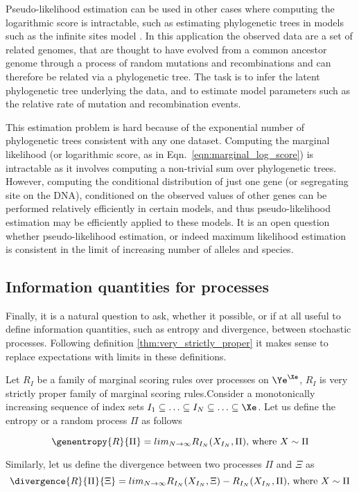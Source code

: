 Pseudo-likelihood estimation can be used in other cases where computing the logarithmic score is intractable, such as estimating phylogenetic trees in models such as the infinite sites model \cite{something, something} . In this application the observed data are a set of related genomes, that are thought to have evolved from a common ancestor genome through a process of random mutations and recombinations and can therefore be related via a phylogenetic tree. The task is to infer the latent phylogenetic tree underlying the data, and to estimate model parameters such as the relative rate of mutation and recombination events.

This estimation problem is hard because of the exponential number of phylogenetic trees consistent with any one dataset. Computing the marginal likelihood (or logarithmic score, as in Eqn.\ \eqref{eqn:marginal_log_score}) is intractable as it involves computing a non-trivial sum over phylogenetic trees. However, computing the conditional distribution of just one gene (or segregating site on the DNA), conditioned on the observed values of other genes can be performed relatively efficiently in certain models, and thus pseudo-likelihood estimation may be efficiently applied to these models. It is an open question whether pseudo-likelihood estimation, or indeed maximum likelihood estimation is consistent in the limit of increasing number of alleles and species.

\subsection{Information quantities for processes}

Finally, it is a natural question to ask, whether it possible, or if at all useful to define information quantities, such as entropy and divergence, between stochastic processes. Following definition \ref{thm:very_strictly_proper} it makes sense to replace expectations with limits in these definitions.

\begin{definition}\label{thm:process_entropy_divergence}
Let $R_{I}$ be a family of marginal scoring rules over processes on $\Ye^{\Xe}$, $R_{I}$ is very strictly proper family of marginal scoring rules.Consider a monotonically increasing sequence of index sets $I_1\subseteq\ldots\subseteq I_N \subseteq \ldots \subseteq \Xe$. Let us define the entropy or a random process $\Pi$ as follows

\begin{equation}
	\genentropy{R}{\Pi} = lim_{N\rightarrow\infty}R_{I_N}(X_{I_N},\Pi) \mbox{, where } X \sim \Pi
\end{equation}

Similarly, let us define the divergence between two processes $\Pi$ and $\Xi$ as
\begin{equation}
	\divergence{R}{\Pi}{\Xi} =  lim_{N\rightarrow\infty}R_{I_N}(X_{I_N},\Xi) - R_{I_N}(X_{I_N},\Pi) \mbox{, where } X \sim \Pi
\end{equation}
\end{definition}

